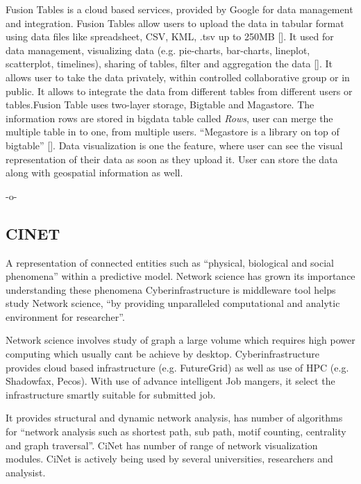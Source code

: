 Fusion Tables is a cloud based services, provided by Google for data
management and integration. Fusion Tables allow users to upload the
data in tabular format using data files like spreadsheet, CSV, KML,
.tsv up to 250MB [\cite{www-FusionTableSupport}]. It used for data
management, visualizing data (e.g. pie-charts, bar-charts, lineplot,
scatterplot, timelines), sharing of tables, filter and aggregation the
data [\cite{wiki-FusionTable}].  It allows user to take the data
privately, within controlled collaborative group or in public. It
allows to integrate the data from different tables from different
users or tables.Fusion Table uses two-layer storage, Bigtable and
Magastore. The information rows are stored in bigdata table called
\textit{Rows}, user can merge the multiple table in to one, from multiple
users. ``Megastore is a library on top of
bigtable'' [\cite{GoogleFusionTable2012}]. Data visualization is one the
feature, where user can see the visual representation of their data as
soon as they upload it. User can store the data along with geospatial
information as well.

 -o-

\subsection{CINET}

A representation of connected entities such as ``physical, biological
and social phenomena'' within a predictive
model\cite{www-bi-vt-edu}. Network science has grown its importance
understanding these phenomena Cyberinfrastructure is middleware tool
helps study Network science, ``by providing unparalleled computational
and analytic environment for
researcher''\cite{www-portal-futuresystems-org-projects-233}.
 
Network science involves study of graph a large volume which requires
high power computing which usually cant be achieve by
desktop. Cyberinfrastructure provides cloud based infrastructure
(e.g. FutureGrid) as well as use of HPC (e.g. Shadowfax, Pecos). With
use of advance intelligent Job mangers, it select the infrastructure
smartly suitable for submitted job.
     
It provides structural and dynamic network analysis, has number of
algorithms for ``network analysis such as shortest path, sub path,
motif counting, centrality and graph traversal''. CiNet has number of
range of network visualization modules.  CiNet is actively being used
by several universities, researchers and analysist.

